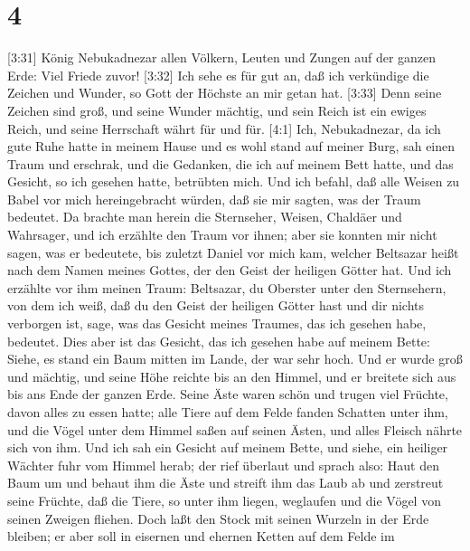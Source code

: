 \hypertarget{section-3}{%
\section{4}\label{section-3}}

 {[}3:31{]} König Nebukadnezar allen Völkern, Leuten und
Zungen auf der ganzen Erde: Viel Friede zuvor!  {[}3:32{]}
Ich sehe es für gut an, daß ich verkündige die Zeichen und Wunder, so
Gott der Höchste an mir getan hat.  {[}3:33{]} Denn seine
Zeichen sind groß, und seine Wunder mächtig, und sein Reich ist ein
ewiges Reich, und seine Herrschaft währt für und für. 
{[}4:1{]} Ich, Nebukadnezar, da ich gute Ruhe hatte in meinem Hause und
es wohl stand auf meiner Burg,  sah einen Traum und
erschrak, und die Gedanken, die ich auf meinem Bett hatte, und das
Gesicht, so ich gesehen hatte, betrübten mich.  Und ich
befahl, daß alle Weisen zu Babel vor mich hereingebracht würden, daß sie
mir sagten, was der Traum bedeutet.  Da brachte man herein
die Sternseher, Weisen, Chaldäer und Wahrsager, und ich erzählte den
Traum vor ihnen; aber sie konnten mir nicht sagen, was er bedeutete,
 bis zuletzt Daniel vor mich kam, welcher Beltsazar heißt
nach dem Namen meines Gottes, der den Geist der heiligen Götter hat. Und
ich erzählte vor ihm meinen Traum:  Beltsazar, du Oberster
unter den Sternsehern, von dem ich weiß, daß du den Geist der heiligen
Götter hast und dir nichts verborgen ist, sage, was das Gesicht meines
Traumes, das ich gesehen habe, bedeutet.  Dies aber ist das
Gesicht, das ich gesehen habe auf meinem Bette: Siehe, es stand ein Baum
mitten im Lande, der war sehr hoch.  Und er wurde groß und
mächtig, und seine Höhe reichte bis an den Himmel, und er breitete sich
aus bis ans Ende der ganzen Erde.  Seine Äste waren schön
und trugen viel Früchte, davon alles zu essen hatte; alle Tiere auf dem
Felde fanden Schatten unter ihm, und die Vögel unter dem Himmel saßen
auf seinen Ästen, und alles Fleisch nährte sich von ihm. 
Und ich sah ein Gesicht auf meinem Bette, und siehe, ein heiliger
Wächter fuhr vom Himmel herab;  der rief überlaut und
sprach also: Haut den Baum um und behaut ihm die Äste und streift ihm
das Laub ab und zerstreut seine Früchte, daß die Tiere, so unter ihm
liegen, weglaufen und die Vögel von seinen Zweigen fliehen.
 Doch laßt den Stock mit seinen Wurzeln in der Erde
bleiben; er aber soll in eisernen und ehernen Ketten auf dem Felde im
